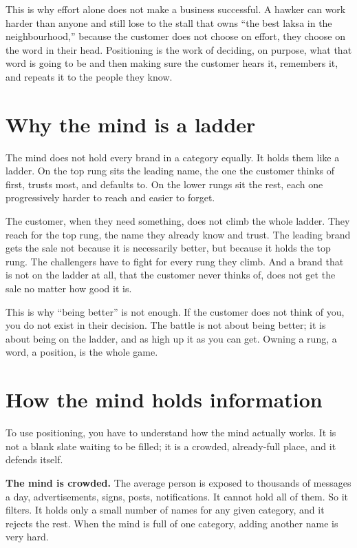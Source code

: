 \documentclass[10pt,twoside,openany]{memoir}
\newcommand{\needspacehead}{\needspace{4\baselineskip}}
\let\oldsection\section
\renewcommand{\section}{\needspacehead\oldsection}
\begin{document}
This is why effort alone does not make a business successful. A hawker
can work harder than anyone and still lose to the stall that owns ``the
best laksa in the neighbourhood,'' because the customer does not choose
on effort, they choose on the word in their head. Positioning is the
work of deciding, on purpose, what that word is going to be and then
making sure the customer hears it, remembers it, and repeats it to the
people they know.

\section{Why the mind is a ladder}\label{why-the-mind-is-a-ladder}

The mind does not hold every brand in a category equally. It holds them
like a ladder. On the top rung sits the leading name, the one the
customer thinks of first, trusts most, and defaults to. On the lower
rungs sit the rest, each one progressively harder to reach and easier to
forget.

The customer, when they need something, does not climb the whole ladder.
They reach for the top rung, the name they already know and trust. The
leading brand gets the sale not because it is necessarily better, but
because it holds the top rung. The challengers have to fight for every
rung they climb. And a brand that is not on the ladder at all, that the
customer never thinks of, does not get the sale no matter how good it
is.

This is why ``being better'' is not enough. If the customer does not
think of you, you do not exist in their decision. The battle is not
about being better; it is about being on the ladder, and as high up it
as you can get. Owning a rung, a word, a position, is the whole game.

\section{How the mind holds
information}\label{how-the-mind-holds-information}

To use positioning, you have to understand how the mind actually works.
It is not a blank slate waiting to be filled; it is a crowded,
already-full place, and it defends itself.

\textbf{The mind is crowded.} The average person is exposed to thousands
of messages a day, advertisements, signs, posts, notifications. It
cannot hold all of them. So it filters. It holds only a small number of
names for any given category, and it rejects the rest. When the mind is
full of one category, adding another name is very hard.
\end{document}
